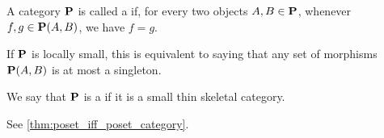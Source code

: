 \begin{definition}\label{def:thin_category}\cite{nLab:thin_category}
  A category $\operatorname{\mathbf{P}}$ is called a  if, for every two objects $A, B \in \operatorname{\mathbf{P}}$, whenever $f, g \in \operatorname{\mathbf{P}}(A, B)$, we have $f = g$.

  If $\operatorname{\mathbf{P}}$ is locally small, this is equivalent to saying that any set of morphisms $\operatorname{\mathbf{P}}(A, B)$ is at most a singleton.
\end{definition}

\begin{definition}\label{def:poset_category}
  We say that $\operatorname{\mathbf{P}}$ is a  if it is a small thin skeletal category.

  See \cref{thm:poset_iff_poset_category}.
\end{definition}

